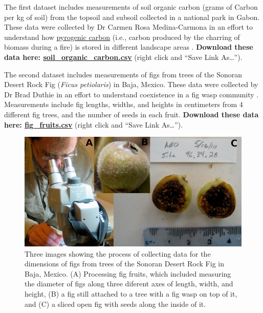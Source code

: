 \documentclass[
]{scrbook}
\begin{document}
The first dataset includes measurements of soil organic carbon (grams of Carbon per kg of soil) from the topsoil and subsoil collected in a national park in Gabon.
These data were collected by Dr Carmen Rosa Medina-Carmona in an effort to understand how \href{https://bg.copernicus.org/articles/3/397/2006/bg-3-397-2006.pdf}{pyrogenic carbon} (i.e., carbon produced by the charring of biomass during a fire) is stored in different landscape areas \citep{Santin2016, Preston2006}.
\textbf{Download these data here: \href{https://raw.githubusercontent.com/bradduthie/SCIU4T4/main/data/soil_organic_carbon.csv}{soil\_organic\_carbon.csv}} (right click and ``Save Link As\ldots{}'').

The second dataset includes measurements of figs from trees of the Sonoran Desert Rock Fig (\emph{Ficus petiolaris}) in Baja, Mexico.
These data were collected by Dr Brad Duthie in an effort to understand coexistence in a fig wasp community \citep{Duthie2015b, Duthie2016}.
Measurements include fig lengths, widths, and heights in centimeters from 4 different fig trees, and the number of seeds in each fruit.
\textbf{Download these data here: \href{https://raw.githubusercontent.com/bradduthie/SCIU4T4/main/data/fig_fruits.csv}{fig\_fruits.csv}} (right click and ``Save Link As\ldots{}'').

\begin{figure}
\includegraphics[width=1\linewidth]{img/fig_data_set} \caption{Three images showing the process of collecting data for the dimensions of figs from trees of the Sonoran Desert Rock Fig in Baja, Mexico. (A) Processing fig fruits, which included measuring the diameter of figs along three diferent axes of length, width, and height, (B) a fig still attached to a tree with a fig wasp on top of it, and (C) a sliced open fig with seeds along the inside of it.}\label{fig:unnamed-chunk-23}
\end{figure}
\end{document}
